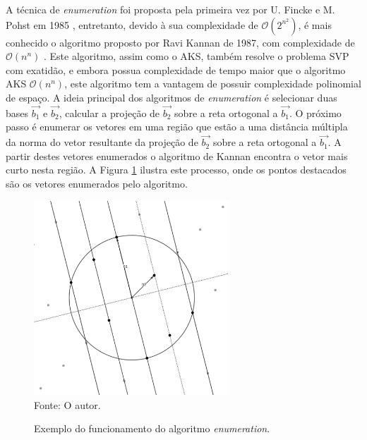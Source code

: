     A técnica de \textit{enumeration} foi proposta pela primeira vez por U. Fincke e M. Pohst em 1985 \cite{enumeration_fincke_pohst}, entretanto, devido à sua complexidade de $\mathcal{O}(2^{n^2})$, é mais conhecido o algoritmo proposto por Ravi Kannan de 1987, com complexidade de $\mathcal{O}(n^n)$ \cite{enumeration_kannan}. Este algoritmo, assim como o AKS, também resolve o problema SVP com exatidão, e embora possua complexidade de tempo maior que o algoritmo AKS $\mathcal{O}(n^n)$, este algoritmo tem a vantagem de possuir complexidade polinomial de espaço. A ideia principal dos algoritmos de \textit{enumeration} é selecionar duas bases $\vec{b_1}$ e $\vec{b_2}$, calcular a projeção de $\vec{b_2}$ sobre a reta ortogonal a $\vec{b_1}$. O próximo passo é enumerar os vetores em uma região que estão a uma distância múltipla da norma do vetor resultante da projeção de $\vec{b_2}$ sobre a reta ortogonal a $\vec{b_1}$. A partir destes vetores enumerados o algoritmo de Kannan encontra o vetor mais curto nesta região. A Figura \ref{fig:lattice_enumeration} ilustra este processo, onde os pontos destacados são os vetores enumerados pelo algoritmo.

    \begin{figure}[htb!]
        \centering
        \caption{Exemplo do funcionamento do algoritmo \textit{enumeration}.}
        \includegraphics[width=0.65\textwidth]{Figuras/lattice_enumeration.png}\\
        \footnotesize{Fonte: O autor.}
        \label{fig:lattice_enumeration}
    \end{figure}

